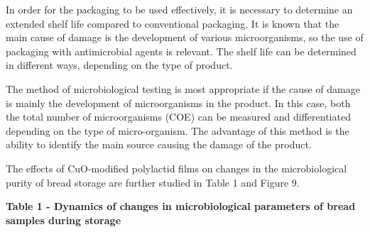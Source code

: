 In order for the packaging to be used effectively, it is necessary to
determine an extended shelf life compared to conventional packaging. It
is known that the main cause of damage is the development of various
microorganisms, so the use of packaging with antimicrobial agents is
relevant. The shelf life can be determined in different ways, depending
on the type of product.

The method of microbiological testing is most appropriate if the cause
of damage is mainly the development of microorganisms in the product. In
this case, both the total number of microorganisms (COE) can be measured
and differentiated depending on the type of micro-organism. The
advantage of this method is the ability to identify the main source
causing the damage of the product.

The effects of CuO-modified polylactid films on changes in the
microbiological purity of bread storage are further studied in Table 1
and Figure 9.

{\bfseries Table 1 - Dynamics of changes in microbiological parameters of
bread samples during storage}

